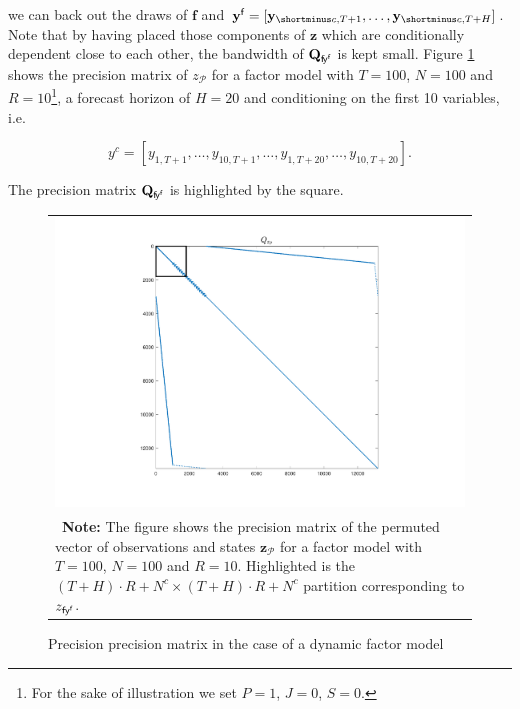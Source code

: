 \documentclass[notitlepage,a4paper,12pt]{article}
\begin{document}
we can back out the draws of $\mathbf{f}$ and $\mathbf{y}^{\sf{f}} = [\mathbf{y}_{\shortminus c, T+1}, \dots, \mathbf{y}_{\shortminus c, T+H}]$.\\

Note that by having placed those components of $\mathbf{z}$ which are conditionally dependent close to each other, the bandwidth of $\mathbf{Q}_{\sf{f}\! y^{\sf{f}}}$ is kept small. Figure \ref{figQDFM} shows the precision matrix of $z_{\mathcal{P}}$ for a factor model with $T=100$, $N=100$ and $R=10$\footnote{For the sake of illustration we set $P=1$, $J=0$, $S=0$.}, a forecast horizon of $H=20$ and conditioning on the first 10 variables, i.e.

$$
y^c = [y_{1,T+1}, \dots, y_{10,T+1}, \dots, y_{1,T+20}, \dots, y_{10,T+20}].
$$

The precision matrix $\mathbf{Q}_{\sf{f}\! y^{\sf{f}}}$ is highlighted by the square. 

\begin{figure}[htbp] \centering
    \caption{Precision precision matrix in the case of a dynamic factor model \label{figQDFM}}
    \footnotesize
    \begin{tabular}{p{16cm}}
    \multicolumn{1}{c}{\includegraphics*[scale = 0.6]{../figures/fig_Qperm_DFM.pdf}} \\
    {
    \footnotesize \textbf{Note:} The figure shows the precision matrix of the permuted vector of observations and states $\mathbf{z}_{\mathcal{P}}$ for a factor model with $T=100$, $N=100$ and $R=10$. Highlighted is the $(T+H)\cdot R + N^c \times (T+H) \cdot R + N^c$ partition corresponding to $z_{\sf{f} y^{\sf{f}}}$.  
    }
    \end{tabular}
    \newline
    \normalsize
\end{figure}
\end{document}

